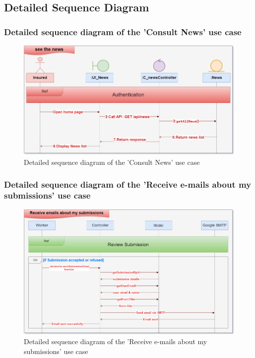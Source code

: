 \subsection{Detailed Sequence Diagram}
\subsubsection{Detailed sequence diagram of the 'Consult News' use case}
\begin{figure}[h!]
    \centering
    \includegraphics[width=1\textwidth]{figures/det see the news.png}
    \caption{Detailed sequence diagram of the 'Consult News' use case}
\end{figure}
\clearpage
\subsubsection{Detailed sequence diagram of the 'Receive e-mails about my submissions' use case}
\begin{figure}[h!]
    \centering
    \includegraphics[width=1\textwidth]{figures/det Receive emails about my submissions.png}
    \caption{Detailed sequence diagram of the 'Receive e-mails about my submissions' use case}
\end{figure}
